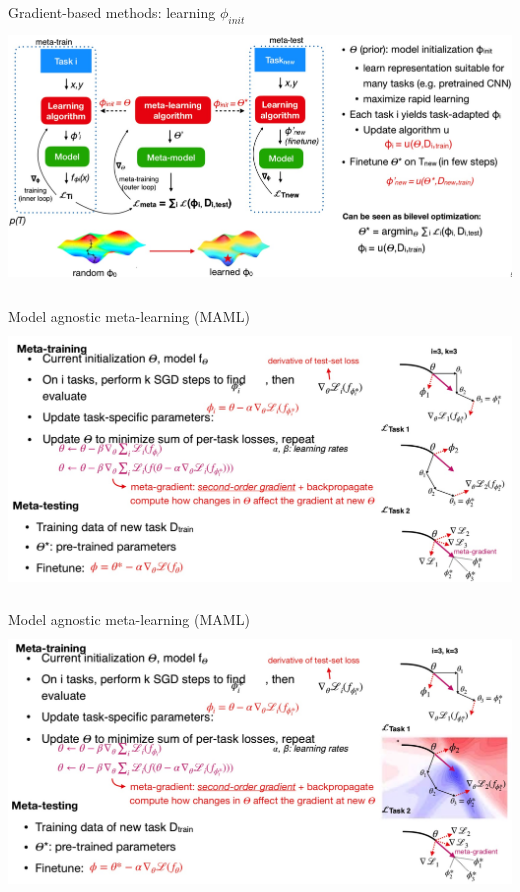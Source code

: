 \begin{frame}{Gradient-based methods: learning $\phi_{init}$}
    \centering\includegraphics[height=7cm]{image/img005015.jpg}
\end{frame}
\begin{frame}{Model agnostic meta-learning (MAML)}
    \centering\includegraphics[height=7cm]{image/img005114.jpg}
\end{frame}
\begin{frame}{Model agnostic meta-learning (MAML)}
    \centering\includegraphics[height=7cm]{image/img005224.jpg}
\end{frame}
